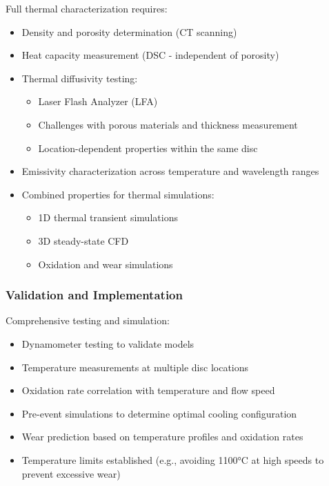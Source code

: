 Full thermal characterization requires:
\begin{itemize}
    \item Density and porosity determination (CT scanning)
    \item Heat capacity measurement (DSC - independent of porosity)
    \item Thermal diffusivity testing:
    \begin{itemize}
        \item Laser Flash Analyzer (LFA)
        \item Challenges with porous materials and thickness measurement
        \item Location-dependent properties within the same disc
    \end{itemize}
    \item Emissivity characterization across temperature and wavelength ranges
    \item Combined properties for thermal simulations:
    \begin{itemize}
        \item 1D thermal transient simulations
        \item 3D steady-state CFD
        \item Oxidation and wear simulations
    \end{itemize}
\end{itemize}

\subsubsection*{Validation and Implementation}

Comprehensive testing and simulation:
\begin{itemize}
    \item Dynamometer testing to validate models
    \item Temperature measurements at multiple disc locations
    \item Oxidation rate correlation with temperature and flow speed
    \item Pre-event simulations to determine optimal cooling configuration
    \item Wear prediction based on temperature profiles and oxidation rates
    \item Temperature limits established (e.g., avoiding 1100°C at high speeds to prevent excessive wear)
\end{itemize}

